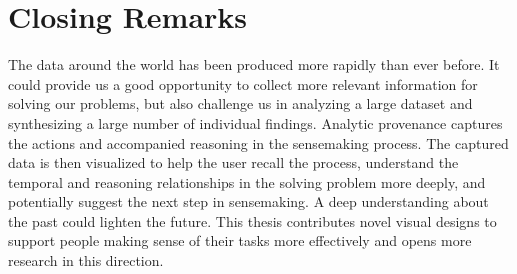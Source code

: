 \section{Closing Remarks}
The data around the world has been produced more rapidly than ever before. It could provide us a good opportunity to collect more relevant information for solving our problems, but also challenge us in analyzing a large dataset and synthesizing a large number of individual findings. Analytic provenance captures the actions and accompanied reasoning in the sensemaking process. The captured data is then visualized to help the user recall the process, understand the temporal and reasoning relationships in the solving problem more deeply, and potentially suggest the next step in sensemaking. A deep understanding about the past could lighten the future. This thesis contributes novel visual designs to support people making sense of their tasks more effectively and opens more research in this direction.